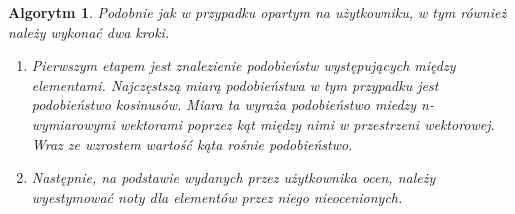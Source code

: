 \documentclass[12pt,a4paper]{report}
\newtheorem{algorytm}[df]{Algorytm}
\begin{document}
\begin{algorytm}
Podobnie jak w przypadku opartym na użytkowniku, w tym również należy wykonać dwa kroki.
\begin{enumerate}
\item Pierwszym etapem jest znalezienie podobieństw występujących między elementami. Najczęstszą miarą podobieństwa w tym przypadku jest podobieństwo kosinusów. Miara ta wyraża podobieństwo miedzy n-wymiarowymi wektorami poprzez kąt między nimi w przestrzeni wektorowej. Wraz ze wzrostem wartość kąta rośnie podobieństwo.
\item Następnie, na podstawie wydanych przez użytkownika ocen, należy wyestymować noty dla elementów przez niego nieocenionych.
\end{enumerate}
\end{algorytm}
\end{document}
